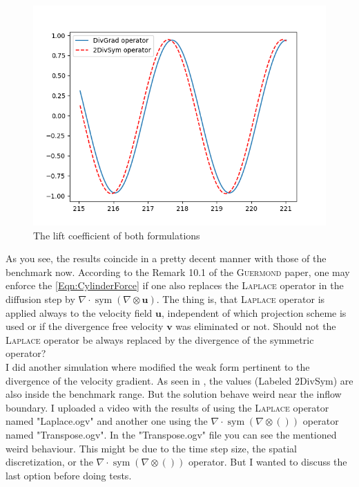 \documentclass[]{scrartcl}
\DeclareMathOperator{\Sym}{sym}
\begin{document}
\begin{figure}
	\centering
	\includegraphics[width=0.5\linewidth]{LiftCoefficient.png}
	\caption{The lift coefficient of both formulations}
	\label{Fig:Lift}
\end{figure}
As you see, the results coincide in a pretty decent manner with those of the benchmark now. According to the Remark 10.1 of the \textsc{Guermond} paper, one may enforce the \cref{Eqn:CylinderForce} if one also replaces the \textsc{Laplace} operator in the diffusion step by $\nabla \cdot \Sym (\nabla \otimes \mathbf{u})$. The thing is, that \textsc{Laplace} operator is applied always to the velocity field $\mathbf{u}$, independent of which projection scheme is used or if the divergence free velocity $\mathbf{v}$ was eliminated or not. Should not the \textsc{Laplace} operator be always replaced by the divergence of the symmetric operator?\\
I did another simulation where modified the weak form pertinent to the divergence of the velocity gradient. As seen in , the values (Labeled 2DivSym) are also inside the benchmark range. But the solution behave weird near the inflow boundary. I uploaded a video with the results of using the \textsc{Laplace} operator named "Laplace.ogv" and another one using the $\nabla \cdot \Sym (\nabla \otimes ())$ operator named "Transpose.ogv". In the  "Transpose.ogv" file you can see the mentioned weird behaviour. This might be due to the time step size, the spatial discretization, or the $\nabla \cdot \Sym (\nabla \otimes ())$ operator. But I wanted to discuss the last option before doing tests.
\end{document}
